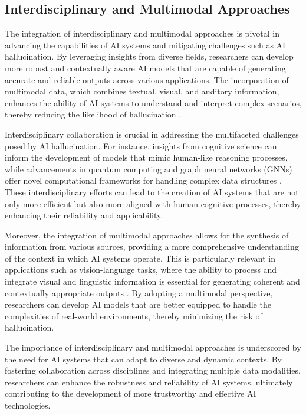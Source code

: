 
\subsection{Interdisciplinary and Multimodal Approaches} \label{subsec:Interdisciplinary and Multimodal Approaches}

The integration of interdisciplinary and multimodal approaches is pivotal in advancing the capabilities of AI systems and mitigating challenges such as AI hallucination. By leveraging insights from diverse fields, researchers can develop more robust and contextually aware AI models that are capable of generating accurate and reliable outputs across various applications. The incorporation of multimodal data, which combines textual, visual, and auditory information, enhances the ability of AI systems to understand and interpret complex scenarios, thereby reducing the likelihood of hallucination \cite{ramesh2021zero}.



Interdisciplinary collaboration is crucial in addressing the multifaceted challenges posed by AI hallucination. For instance, insights from cognitive science can inform the development of models that mimic human-like reasoning processes, while advancements in quantum computing and graph neural networks (GNNs) offer novel computational frameworks for handling complex data structures \cite{liao2024graphneuralnetworksquantum}. These interdisciplinary efforts can lead to the creation of AI systems that are not only more efficient but also more aligned with human cognitive processes, thereby enhancing their reliability and applicability.



Moreover, the integration of multimodal approaches allows for the synthesis of information from various sources, providing a more comprehensive understanding of the context in which AI systems operate. This is particularly relevant in applications such as vision-language tasks, where the ability to process and integrate visual and linguistic information is essential for generating coherent and contextually appropriate outputs \cite{li2023blip}. By adopting a multimodal perspective, researchers can develop AI models that are better equipped to handle the complexities of real-world environments, thereby minimizing the risk of hallucination.



The importance of interdisciplinary and multimodal approaches is underscored by the need for AI systems that can adapt to diverse and dynamic contexts. By fostering collaboration across disciplines and integrating multiple data modalities, researchers can enhance the robustness and reliability of AI systems, ultimately contributing to the development of more trustworthy and effective AI technologies.



